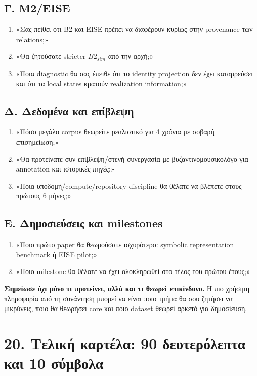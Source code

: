 \documentclass[9pt,a4paper]{extarticle}
\begin{document}
\subsection*{Γ. M2/EISE}
\begin{enumerate}
\item «Σας πείθει ότι B2 και EISE πρέπει να διαφέρουν κυρίως στην provenance των relations;»
\item «Θα ζητούσατε stricter \(B2_{sim}\) από την αρχή;»
\item «Ποια diagnostic θα σας έπειθε ότι το identity projection δεν έχει καταρρεύσει και ότι τα local states κρατούν realization information;»
\end{enumerate}

\subsection*{Δ. Δεδομένα και επίβλεψη}
\begin{enumerate}
\item «Πόσο μεγάλο corpus θεωρείτε ρεαλιστικό για 4 χρόνια με σοβαρή επισημείωση;»
\item «Θα προτείνατε συν-επίβλεψη/στενή συνεργασία με βυζαντινομουσικολόγο για annotation και ιστορικές πηγές;»
\item «Ποια υποδομή/compute/repository discipline θα θέλατε να βλέπετε στους πρώτους 6 μήνες;»
\end{enumerate}

\subsection*{Ε. Δημοσιεύσεις και milestones}
\begin{enumerate}
\item «Ποιο πρώτο paper θα θεωρούσατε ισχυρότερο: symbolic representation benchmark ή EISE pilot;»
\item «Ποιο milestone θα θέλατε να έχει ολοκληρωθεί στο τέλος του πρώτου έτους;»
\end{enumerate}

\begin{warnbox}
\textbf{Σημείωσε όχι μόνο τι προτείνει, αλλά και τι θεωρεί επικίνδυνο.} Η πιο χρήσιμη πληροφορία από τη συνάντηση μπορεί να είναι ποιο τμήμα θα σου ζητήσει να μικρύνεις, ποιο θα θεωρήσει core και ποιο dataset θεωρεί αρκετό για δημοσίευση.
\end{warnbox}

\newpage
\section*{20. Τελική καρτέλα: 90 δευτερόλεπτα και 10 σύμβολα}
\end{document}
